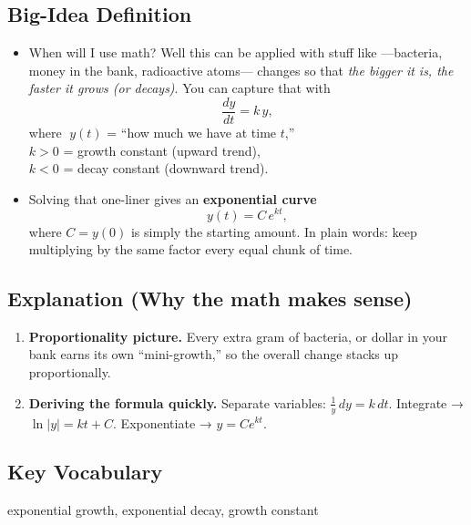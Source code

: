 \documentclass{article}
\begin{document}
\subsection*{Big-Idea Definition}
\begin{itemize}
  \item When will I use math? Well this can be applied with stuff like —bacteria, money in the bank, radioactive atoms— changes so that \emph{the bigger it is, the faster it grows (or decays)}.  
        You can capture that with 
        \[
          \frac{dy}{dt}=k\,y,
        \]
        where  
        \(\;y(t)\) = “how much we have at time \(t\),”  \\
        \(k>0\) = growth constant (upward trend),  \\
        \(k<0\) = decay constant (downward trend).
  \item Solving that one-liner gives an \textbf{exponential curve}  
        \[
          y(t)=C\,e^{kt},
        \]
        where \(C=y(0)\) is simply the starting amount.  
        In plain words: keep multiplying by the same factor every equal chunk of time.
\end{itemize}

\subsection*{Explanation (Why the math makes sense)}
\begin{enumerate}
  \item \textbf{Proportionality picture.}  Every extra gram of bacteria, or dollar in your bank earns its own “mini-growth,” so the overall change stacks up proportionally.
  \item \textbf{Deriving the formula quickly.}  Separate variables:
        \(\displaystyle \frac{1}{y}\,dy = k\,dt\).  
        Integrate → \(\ln|y| = k t + C\).  
        Exponentiate → \(y = C e^{k t}\).
\end{enumerate}

\subsection*{Key Vocabulary}
exponential growth, exponential decay, growth constant
\end{document}
